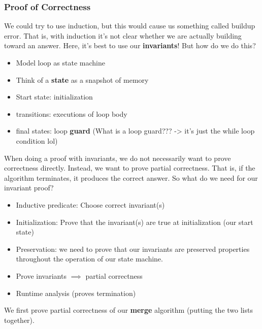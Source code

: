 \documentclass[11pt]{article}
\begin{document}
\subsubsection{Proof of Correctness}
We could try to use induction, but this would cause us something called buildup error. That is, with induction it's not clear whether we are actually building toward an answer. Here, it's best to use our \textbf{invariants}! But how do we do this?
\begin{itemize}
    \item Model loop as state machine
    \item Think of a \textbf{state} as a snapshot of memory
    \item Start state: initialization
    \item transitions: executions of loop body
    \item final states: loop \textbf{guard} (What is a loop guard??? -> it's just the while loop condition lol)
\end{itemize}
When doing a proof with invariants, we do not necessarily want to prove correctness directly. Instead, we want to prove partial correctness. That is, if the algorithm terminates, it produces the correct answer. So what do we need for our invariant proof?
\begin{itemize}
    \item Inductive predicate: Choose correct invariant(s)
    \item Initialization: Prove that the invariant(s) are true at initialization (our start state)
    \item Preservation: we need to prove that our invariants are preserved properties throughout the operation of our state machine.
    \item Prove invariants $\implies$ partial correctness
    \item Runtime analysis (proves termination)
\end{itemize}
We first prove partial correctness of our \textbf{merge} algorithm (putting the two lists together).
\end{document}
